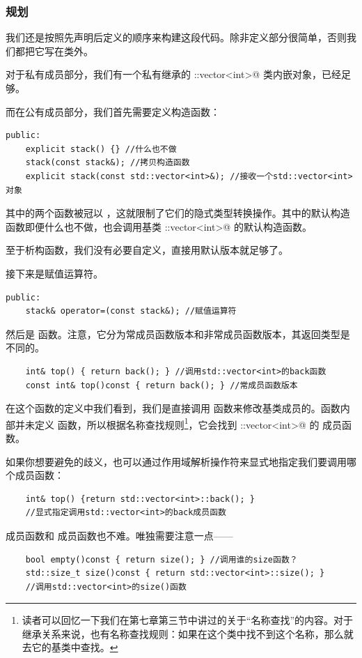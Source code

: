 \subsubsection*{规划}
我们还是按照先声明后定义的顺序来构建这段代码。除非定义部分很简单，否则我们都把它写在类外。\par
对于私有成员部分，我们有一个私有继承的 \lstinline@std::vector<int>@ 类内嵌对象，已经足够。\par
而在公有成员部分，我们首先需要定义构造函数：
\begin{lstlisting}
public:
    explicit stack() {} //什么也不做
    stack(const stack&); //拷贝构造函数
    explicit stack(const std::vector<int>&); //接收一个std::vector<int>对象
\end{lstlisting}
其中的两个函数被冠以 \lstinline@explicit@，这就限制了它们的隐式类型转换操作。其中的默认构造函数即便什么也不做，也会调用基类 \lstinline@std::vector<int>@ 的默认构造函数。\par
至于析构函数，我们没有必要自定义，直接用默认版本就足够了。\par
接下来是赋值运算符。
\begin{lstlisting}
public:
    stack& operator=(const stack&); //赋值运算符
\end{lstlisting}\par
然后是 \lstinline@top@ 函数。注意，它分为常成员函数版本和非常成员函数版本，其返回类型是不同的。
\begin{lstlisting}
    int& top() { return back(); } //调用std::vector<int>的back函数
    const int& top()const { return back(); } //常成员函数版本
\end{lstlisting}
在这个函数的定义中我们看到，我们是直接调用 \lstinline@back@ 函数来修改基类成员的。\lstinline@stack@ 函数内部并未定义 \lstinline@back@ 函数，所以根据名称查找规则\footnote{读者可以回忆一下我们在第七章第三节中讲过的关于``名称查找''的内容。对于继承关系来说，也有名称查找规则：如果在这个类中找不到这个名称，那么就去它的基类中查找。}，它会找到 \lstinline@std::vector<int>@ 的 \lstinline@back@ 成员函数。\par
如果你想要避免的歧义，也可以通过作用域解析操作符来显式地指定我们要调用哪个成员函数：
\begin{lstlisting}
    int& top() {return std::vector<int>::back(); }
    //显式指定调用std::vector<int>的back成员函数
\end{lstlisting}\par
\lstinline@empty@ 成员函数和 \lstinline@size@ 成员函数也不难。唯独需要注意一点——
\begin{lstlisting}
    bool empty()const { return size(); } //调用谁的size函数？
    std::size_t size()const { return std::vector<int>::size(); }
    //调用std::vector<int>的size()函数
\end{lstlisting}
